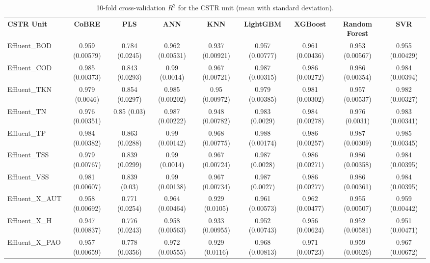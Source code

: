 \documentclass{article}
\begin{document}
\begin{table}[h]
\centering
\scriptsize
\begin{tabular}{lcccccccc}
\textbf{CSTR Unit} & \textbf{CoBRE} & \textbf{PLS} & \textbf{ANN} & \textbf{KNN} & \textbf{LightGBM} & \textbf{XGBoost} & \textbf{Random Forest} & \textbf{SVR} \\
Effluent\_BOD & 0.959 (0.00579) & 0.784 (0.0245) & 0.962 (0.00531) & 0.937 (0.00921) & 0.957 (0.00777) & 0.961 (0.00436) & 0.953 (0.00567) & 0.955 (0.00429) \\
Effluent\_COD & 0.985 (0.00373) & 0.843 (0.0293) & 0.99 (0.0014) & 0.967 (0.00721) & 0.987 (0.00315) & 0.986 (0.00272) & 0.986 (0.00354) & 0.984 (0.00394) \\
Effluent\_TKN & 0.979 (0.0046) & 0.854 (0.0297) & 0.985 (0.00202) & 0.95 (0.00972) & 0.979 (0.00385) & 0.981 (0.00302) & 0.957 (0.00537) & 0.982 (0.00327) \\
Effluent\_TN & 0.976 (0.00351) & 0.85 (0.03) & 0.987 (0.00222) & 0.948 (0.00782) & 0.983 (0.0029) & 0.984 (0.00278) & 0.976 (0.0031) & 0.983 (0.00341) \\
Effluent\_TP & 0.984 (0.00382) & 0.863 (0.0288) & 0.99 (0.00142) & 0.968 (0.00775) & 0.988 (0.00174) & 0.986 (0.00257) & 0.987 (0.00309) & 0.985 (0.00345) \\
Effluent\_TSS & 0.979 (0.00767) & 0.839 (0.0299) & 0.99 (0.0014) & 0.967 (0.00724) & 0.987 (0.0028) & 0.986 (0.00271) & 0.986 (0.00358) & 0.984 (0.00395) \\
Effluent\_VSS & 0.981 (0.00607) & 0.839 (0.03) & 0.99 (0.00138) & 0.967 (0.00734) & 0.987 (0.0027) & 0.986 (0.00277) & 0.986 (0.00361) & 0.984 (0.00395) \\
Effluent\_X\_AUT & 0.958 (0.00692) & 0.771 (0.0254) & 0.964 (0.00464) & 0.929 (0.0105) & 0.961 (0.00573) & 0.962 (0.00477) & 0.955 (0.00507) & 0.959 (0.00442) \\
Effluent\_X\_H & 0.947 (0.00837) & 0.776 (0.0243) & 0.958 (0.00563) & 0.933 (0.00955) & 0.952 (0.00743) & 0.956 (0.00624) & 0.952 (0.00581) & 0.951 (0.00471) \\
Effluent\_X\_PAO & 0.957 (0.00659) & 0.778 (0.0356) & 0.972 (0.00555) & 0.929 (0.0116) & 0.968 (0.00813) & 0.971 (0.00723) & 0.959 (0.00626) & 0.967 (0.00672) \\
\end{tabular}
\caption{10-fold cross-validation $R^{2}$ for the CSTR unit (mean with standard deviation).}
\label{tab:cv-cstr}
\end{table}
\end{document}
